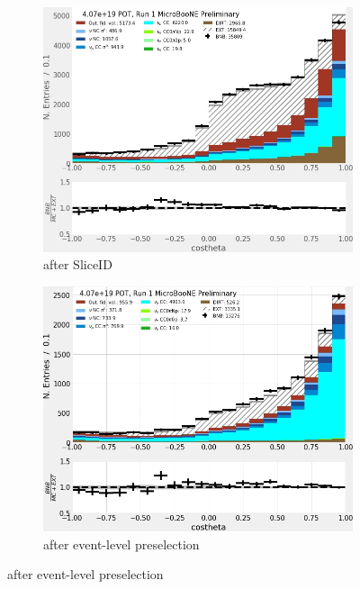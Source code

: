 \begin{figure}[H] 
\begin{center}
    \begin{subfigure}[b]{0.3\textwidth}
    \centering
    \includegraphics[width=1.00\textwidth]{NuMuCCsel/Images/Ryan/Run1_costheta_justSlice.jpg}
    \caption{\label{fig:NuMUCCsel:ryan:trklenSliceID} after SliceID}
    \end{subfigure}
    \begin{subfigure}[b]{0.3\textwidth}
    \centering
    \includegraphics[width=1.00\textwidth]{NuMuCCsel/Images/Ryan/Run1_costheta_justEvtsel.jpg}
    \caption{\label{fig:NuMUCCsel:ryan:trklenEvt} after event-level preselection}

\end{subfigure}
\end{center}
\end{figure}
